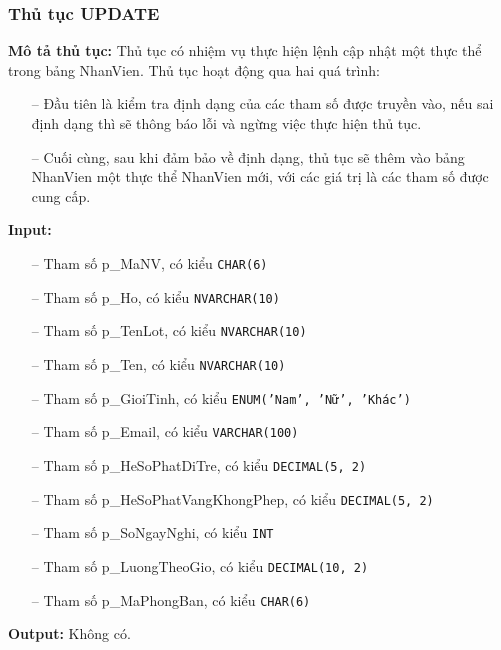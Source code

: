 \newpage
\subsubsection{Thủ tục UPDATE}
\textbf{Mô tả thủ tục:} Thủ tục có nhiệm vụ thực hiện lệnh cập nhật một thực thể trong bảng NhanVien. Thủ tục hoạt động qua hai quá trình: 
\begin{itemize}
    \item [--] Đầu tiên là kiểm tra định dạng của các tham số được truyền vào, nếu sai định dạng thì sẽ thông báo lỗi và ngừng việc thực hiện thủ tục.
    \item [--] Cuối cùng, sau khi đảm bảo về định dạng, thủ tục sẽ thêm vào bảng NhanVien một thực thể NhanVien mới, với các giá trị là các tham số được cung cấp.
\end{itemize} 

\textbf{Input:} 
\begin{itemize}
    \item [--] Tham số p\_MaNV, có kiểu \texttt{CHAR(6)}
    \item [--] Tham số p\_Ho, có kiểu \texttt{NVARCHAR(10)}
    \item [--] Tham số p\_TenLot, có kiểu \texttt{NVARCHAR(10)}
    \item [--] Tham số p\_Ten, có kiểu \texttt{NVARCHAR(10)}
    \item [--] Tham số p\_GioiTinh, có kiểu \texttt{ENUM('Nam', 'Nữ', 'Khác')}
    \item [--] Tham số p\_Email, có kiểu \texttt{VARCHAR(100)}
    \item [--] Tham số p\_HeSoPhatDiTre, có kiểu \texttt{DECIMAL(5, 2)}
    \item [--] Tham số p\_HeSoPhatVangKhongPhep, có kiểu \texttt{DECIMAL(5, 2)}
    \item [--] Tham số p\_SoNgayNghi, có kiểu \texttt{INT}
    \item [--] Tham số p\_LuongTheoGio, có kiểu \texttt{DECIMAL(10, 2)}
    \item [--] Tham số p\_MaPhongBan, có kiểu \texttt{CHAR(6)}
\end{itemize}

\textbf{Output:} Không có.

